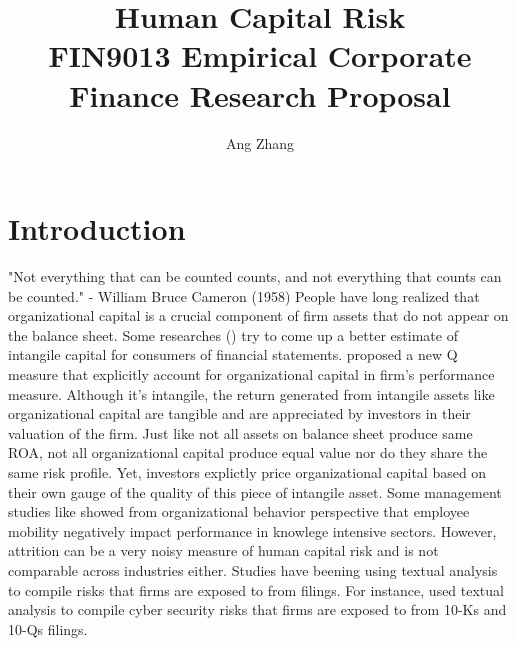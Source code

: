 \documentclass[a4paper, 10pt, authoryear]{elsarticle}
\begin{document}
\title{
    Human Capital Risk \\
    \large FIN9013 Empirical Corporate Finance Research Proposal
}
\author{Ang Zhang}


\maketitle

\section{Introduction}

"Not everything that can be counted counts, and not everything that counts can be counted." - William Bruce Cameron (1958)
\newline
People have long realized that organizational capital is a crucial component of firm assets that do not appear on the balance sheet. Some researches (\cite{iqbalBetterEstimateInternally2024}) try to come up a better estimate of intangile capital for consumers of financial statements. \cite{petersIntangibleCapitalInvestmentq2017} proposed a new Q measure that explicitly account for organizational capital in firm's performance measure. Although it's intangile, the return generated from intangile assets like organizational capital are tangible and are appreciated by investors in their valuation of the firm. Just like not all assets on balance sheet produce same ROA, not all organizational capital produce equal value nor do they share the same risk profile. Yet, investors explictly price organizational capital based on their own gauge of the quality of this piece of intangile asset.
Some management studies like \cite{campbellWhoLeavesWhere2012} showed from organizational behavior perspective that employee mobility negatively impact performance in knowlege intensive sectors. However, attrition can be a very noisy measure of human capital risk and is not comparable across industries either.
Studies have beening using textual analysis to compile risks that firms are exposed to from filings. For instance, \cite{florackisCybersecurityRisk2023} used textual analysis to compile cyber security risks that firms are exposed to from 10-Ks and 10-Qs filings.
\end{document}

